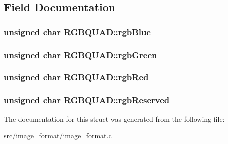 \subsection{Field Documentation}
\hypertarget{structRGBQUAD_a26981c44b82baaabb9cdf9147c13b84b}{
\subsubsection[{rgb\+Blue}]{\setlength{\rightskip}{0pt plus 5cm}unsigned char R\+G\+B\+Q\+U\+A\+D\+::rgb\+Blue}}\label{structRGBQUAD_a26981c44b82baaabb9cdf9147c13b84b}
\hypertarget{structRGBQUAD_abb80bcf0d8dd1a5b636aaa655017d1f9}{
\subsubsection[{rgb\+Green}]{\setlength{\rightskip}{0pt plus 5cm}unsigned char R\+G\+B\+Q\+U\+A\+D\+::rgb\+Green}}\label{structRGBQUAD_abb80bcf0d8dd1a5b636aaa655017d1f9}
\hypertarget{structRGBQUAD_a1bd80a00a260953ea222a10b34035b0c}{
\subsubsection[{rgb\+Red}]{\setlength{\rightskip}{0pt plus 5cm}unsigned char R\+G\+B\+Q\+U\+A\+D\+::rgb\+Red}}\label{structRGBQUAD_a1bd80a00a260953ea222a10b34035b0c}
\hypertarget{structRGBQUAD_aea0f944286f2e4ac1b21ca3f0e7328e5}{
\subsubsection[{rgb\+Reserved}]{\setlength{\rightskip}{0pt plus 5cm}unsigned char R\+G\+B\+Q\+U\+A\+D\+::rgb\+Reserved}}\label{structRGBQUAD_aea0f944286f2e4ac1b21ca3f0e7328e5}


The documentation for this struct was generated from the following file\+:\begin{DoxyCompactItemize}
\item 
src/image\+\_\+format/\hyperlink{image__format_8c}{image\+\_\+format.\+c}\end{DoxyCompactItemize}
